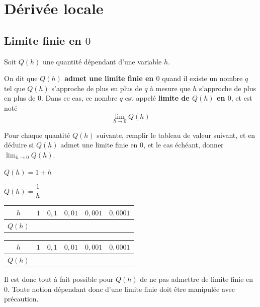 \documentclass{poly}
\begin{document}
\section{Dérivée locale}
\subsection{Limite finie en $0$}
Soit $Q(h)$ une quantité dépendant d'une variable $h$.
\begin{tcolorbox}
\begin{definition}
On dit que \textbf{$Q(h)$ admet une limite finie en $0$} quand il existe un nombre $q$ tel que $Q(h)$ s'approche de plus en plus de $q$ à mesure que $h$ s'approche de plus en plus de $0$. Dans ce cas, ce nombre $q$ est appelé \textbf{limite de $Q(h)$ en $0$}, et est noté
\begin{equation*}
\lim_{h \to 0} Q(h)
\end{equation*}
\end{definition}
\end{tcolorbox}
\begin{example}
Pour chaque quantité $Q(h)$ suivante, remplir le tableau de valeur suivant, et en déduire si $Q(h)$ admet une limite finie en $0$, et le cas échéant, donner $\lim_{h \to 0} Q(h)$.
\begin{alphaquestions}
\item $Q(h) = 1 + h$
\item $Q(h) = \dfrac{1}{h}$
\end{alphaquestions}
\begin{center}
\hfill
\begin{tabular}{|c|p{0.9cm}|p{0.9cm}|p{0.9cm}|p{0.9cm}|p{0.9cm}|}
\hline
$h$ & $1$ & $0,1$ & $0,01$ & $0,001$ & $0,0001$\\
\hline
$Q(h)$ &  &  &  &  & \\
\hline
\end{tabular}
\hfill
\begin{tabular}{|c|p{0.9cm}|p{0.9cm}|p{0.9cm}|p{0.9cm}|p{0.9cm}|}
\hline
$h$ & $1$ & $0,1$ & $0,01$ & $0,001$ & $0,0001$\\
\hline
$Q(h)$ &  &  &  &  & \\
\hline
\end{tabular}
\hfill
\end{center}
\end{example}
\begin{remark}
Il est donc tout à fait possible pour $Q(h)$ de ne pas admettre de limite finie en $0$. Toute notion dépendant donc d'une limite finie doit être manipulée avec précaution.
\end{remark}
\end{document}
